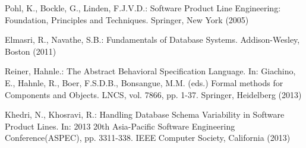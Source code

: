 \documentclass[conference]{IEEEtran}
\begin{document}
\begin{thebibliography}{4}
	
	 Pohl, K., Bockle, G., Linden, F.J.V.D.: Software Product Line Engineering: Foundation, Principles and Techniques. Springer, New York (2005)
	
	 Elmasri, R., Navathe, S.B.: Fundamentals of Database Systems. Addison-Wesley, Boston (2011)
	
	 Reiner, Hahnle.: The Abstract Behavioral Specification Language. In: Giachino, E., Hahnle, R., Boer, F.S.D.B., Bonsangue, M.M. (eds.) Formal methods for Components and Objects. LNCS, vol. 7866, pp. 1-37. Springer, Heidelberg (2013)
	
	 Khedri, N., Khosravi, R.: Handling Database Schema Variability in Software Product Lines. In: 2013 20th Asia-Pacific Software Engineering Conference(ASPEC), pp.
	3311-338. IEEE Computer Society, California (2013)
	
\end{thebibliography}
\end{document}
